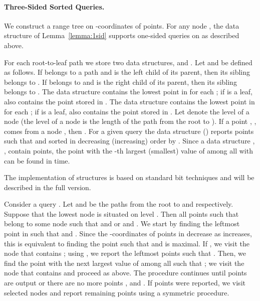 \documentclass[11pt]{article}
\newcommand{\no}[1]{}
\begin{document}
\paragraph{Three-Sided Sorted Queries.} We construct a range tree on
-coordinates of points. For any node , the data structure  of Lemma~\ref{lemma:1sid}
supports one-sided queries on  as described above. 
\no{We also store  lowest points from  
in a data structure .  Using the result of~\cite{FW94}, 
we can find for any 
the highest  such that . 
Hence, we can use  to determine whether  contains at least 
 points that are below . 
If this is not the case, we can find the highest , , 
using . 
}
For each
root-to-leaf path  we store two data structures,  and
.  Let  and  be defined as follows. If 
belongs to a path  and  is the left child of its parent, then
its sibling  belongs to .  If  belongs to  and 
is the right child of its parent, then its sibling  belongs to
.  The data structure  contains the lowest point in
 for each ; if  is a leaf, 
also contains the point stored in .  The data structure 
contains the lowest point in  for each ; if  is a leaf,  also contains the point stored in .  Let
 denote the level of a node  (the level of a node  is the 
length of the path from the root to ). If a point , , comes
from a node , then .  For a given query  the
data structure  () reports points  such that
 and  sorted in decreasing (increasing) order
by .  Since a data structure , , contain
 points, the point with the -th largest (smallest) value of 
among all  with  can be found in  time. 
\no{first  points can be found in  time.}
The implementation of structures  is based on standard bit 
techniques and will be described in the full version.


Consider a query .  Let  and  be
the paths from the root to  and  respectively. Suppose that the
lowest node  is situated on level . Then
all points  such that  belong to some node  such
that  and  or  and .
We start by finding the leftmost point  in  such that
 and . 
Since the -coordinates of points in
 decrease as  increases, this is equivalent to
finding the point  such that  and  is maximal.
If , we visit the node  that contains ; \no{We find the highest point  , . If  is the last (highest) point in , then   
contains at least  points , such that . Otherwise  is the highest among all  
such that .
Then, we use  to report the  leftmost points  such that . 

If  is not the highest point in , then  for any  such that . 
}
 using , we report the  leftmost points  such that . 
Then, we find the point  with the next largest value of 
 among all  such that ; we visit the node 
 that contains  and proceed as above. 
The procedure continues until  points are output or there are no 
more points ,  and . 
If  points were reported, we visit selected nodes  and report remaining  points using a symmetric procedure. 
\end{document}
